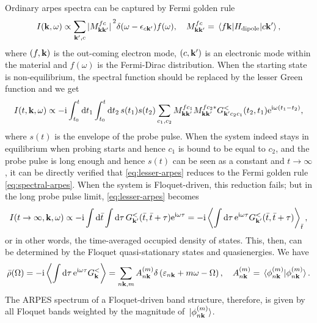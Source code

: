 \documentclass[hyperref, a4paper]{article}
\newcommand*{\ii}{\mathrm{i}}
\newcommand*{\ee}{\mathrm{e}}
\begin{document}
Ordinary \ac{arpes} spectra can be captured by Fermi golden rule \cite{sobota2021angle}
\begin{equation}
    I(\vb{k}, \omega) \propto \sum_{\vb{k}', c} 
    \abs*{M_{\vb{k} \vb{k}'}^{fc}}^2 \delta(\omega - \epsilon_{c \vb{k}'}) f(\omega),
    \quad M^{fc}_{\vb{k} \vb{k}'} = \mel{f \vb{k}}{H_{\text{dipole}}}{c \vb{k}'},
    \label{eq:spectral-arpes}
\end{equation}
where $(f, \vb{k})$ is the out-coming electron mode, 
$(c, \vb{k}')$ is an electronic mode within the material 
and $f(\omega)$ is the Fermi-Dirac distribution.
When the starting state is non-equilibrium, 
the spectral function should be replaced by the lesser Green function 
and we get \cite{freericks2009theoretical,rustagi2018photoemission,schuler2021theory,chan2023giant} 
\begin{equation}
    I(t, \vb{k}, \omega) \propto - \ii \int_{t_0}^t \dd{t_1} \int_{t_0}^t \dd{t_2} s(t_1) s(t_2) 
    \sum_{c_1, c_2}
    M_{\vb{k} \vb{k}'}^{fc_1} M_{\vb{k} \vb{k}'}^{fc_2 *} 
    G^<_{\vb{k}' c_2 c_1}(t_2, t_1) \ee^{\ii \omega (t_1 - t_2)} ,
    \label{eq:lesser-arpes}
\end{equation}
where $s(t)$ is the envelope of the probe pulse.
When the system indeed stays in equilibrium when probing starts
and hence $c_1$ is bound to be equal to $c_2$, 
and the probe pulse is long enough and 
hence $s(t)$ can be seen as a constant and $t \to \infty$, 
it can be directly verified that \eqref{eq:lesser-arpes} 
reduces to the Fermi golden rule \eqref{eq:spectral-arpes}.
When the system is Floquet-driven, this reduction fails;
but in the long probe pulse limit, \eqref{eq:lesser-arpes} becomes 
\begin{equation}
    I(t \to \infty, \vb{k}, \omega) \propto
    - \ii \int \dd{\bar{t}} \int \dd{\tau} G^<_{\vb{k}'}(\bar{t}, \bar{t} + \tau) \ee^{\ii \omega \tau} 
    = - \ii \expval{\int \dd{\tau} \ee^{\ii \omega \tau}
    G^<_{\vb{k}'}(\bar{t}, \bar{t} + \tau)}_{\bar{t}},
\end{equation} 
or in other words, the time-averaged occupied density of states.
This, then, can be determined by the Floquet quasi-stationary states and quasienergies.
We have \cite{rudner2020floquet}
\begin{equation}
    \bar{\rho}(\Omega) = - \ii \expval{\int \dd{\tau} \ee^{\ii \omega \tau} G^<_{\vb{k}}} 
    =\sum_{n \vb{k}, m} A_{n \vb{k}}^{(m)} \delta\left(\varepsilon_{n \vb{k}} +m \omega-\Omega\right), 
    \quad A_{n \vb{k}}^{(m)}= \braket*{\phi_{n \vb{k}}^{(m)}}{\phi_{n \vb{k}}^{(m)}}.
\end{equation}
The ARPES spectrum of a Floquet-driven band structure, therefore, 
is given by all Floquet bands weighted by the magnitude of $\ket*{\phi_{n \vb{k}}^{(m)}}$.
\end{document}
